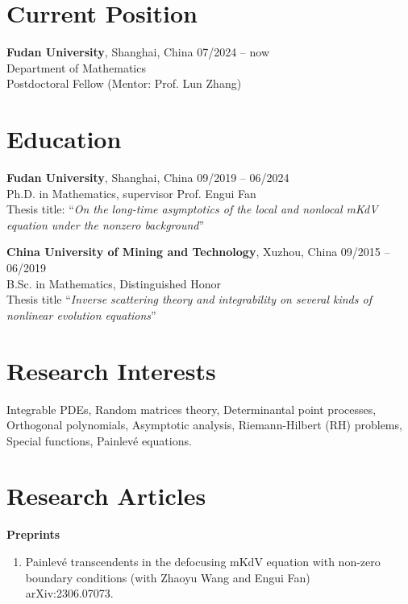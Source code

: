 \documentclass[margin]{res}
\begin{document}
\begin{resume}
\section{Current Position}
\textbf{Fudan University}, Shanghai, China \hfill 07/2024 -- now\\
Department of Mathematics \\
Postdoctoral Fellow (Mentor: Prof. Lun Zhang)


\section{Education}
\textbf{Fudan University}, Shanghai, China \hfill 09/2019 -- 06/2024\\
Ph.D. in Mathematics, supervisor Prof. Engui Fan \\
Thesis title: ``{\sl On the long-time asymptotics of the local and nonlocal mKdV equation under the nonzero background}''
\par

\textbf{China University of Mining and Technology}, Xuzhou, China \hfill 09/2015 -- 06/2019\\ 
B.Sc. in Mathematics, Distinguished Honor \\
Thesis title ``{\sl Inverse scattering theory and integrability on several kinds of nonlinear evolution equations}''


\section{Research Interests}
Integrable PDEs, Random matrices theory, Determinantal point processes, 
Orthogonal polynomials, Asymptotic analysis, Riemann-Hilbert (RH) problems, Special functions, 
Painlev\'e equations.

\section{Research Articles}
\textbf{Preprints}
\begin{enumerate}[1.]
    \item Painlev\'{e} transcendents in the defocusing mKdV equation with non-zero boundary conditions (with Zhaoyu Wang and Engui Fan)\\
    arXiv:2306.07073.
\end{enumerate}


\end{resume}
\end{document}
